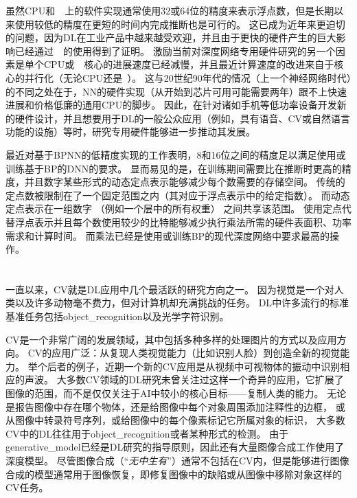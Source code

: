 虽然CPU和~~上的软件实现通常使用32或64位的精度来表示浮点数，但是长期以来使用较低的精度在更短的时间内完成推断也是可行的\citep{Holt-et-al-1991,Holi+Hwang-1993,Presley-et-al-1994,Simard+Graf-NIPS1994,Wawrzynek-et-al-IEEE1996,Savich-et-al-2007}。
这已成为近年来更迫切的问题，因为\gls{DL}在工业产品中越来越受欢迎，并且由于更快的硬件产生的巨大影响已经通过~~的使用得到了证明。
激励当前对深度网络专用硬件研究的另一个因素是单个CPU或~~核心的进展速度已经减慢，并且最近计算速度的改进来自于核心的并行化（无论CPU还是~）。
这与20世纪90年代的情况（上一个神经网络时代）的不同之处在于，\gls{NN}的硬件实现（从开始到芯片可用可能需要两年）跟不上快速进展和价格低廉的通用CPU的脚步。
因此，在针对诸如手机等低功率设备开发新的硬件设计，并且想要用于\gls{DL}的一般公众应用（例如，具有语音、\gls{CV}或自然语言功能的设施）等时，研究专用硬件能够进一步推动其发展。


最近对基于\gls{BP}\gls{NN}的低精度实现的工作\citep{Vanhoucke-et-al-2011,Courbariaux-et-al-ICLR2015workshop,Gupta-et-al-2015}表明，8和16位之间的精度足以满足使用或训练基于\gls{BP}的\gls{DNN}的要求。
显而易见的是，在训练期间需要比在推断时更高的精度，并且数字某些形式的动态定点表示能够减少每个数需要的存储空间。
传统的定点数被限制在了一个固定范围之内（其对应于浮点表示中的给定指数）。
而动态定点表示在一组数字 （例如一个层中的所有权重） 之间共享该范围。
使用定点代替浮点表示并且每个数使用较少的比特能够减少执行乘法所需的硬件表面积、功率需求和计算时间。
而乘法已经是使用或训练\gls{BP}的现代深度网络中要求最高的操作。



\section{}
\label{sec:computer_vision}

一直以来，\gls{CV}就是\gls{DL}应用中几个最活跃的研究方向之一。
因为视觉是一个对人类以及许多动物毫不费力，但对计算机却充满挑战的任务\citep{ballard1983parallel}。
\gls{DL}中许多流行的标准基准任务包括\gls{object_recognition}以及光学字符识别。


\gls{CV}是一个非常广阔的发展领域，其中包括多种多样的处理图片的方式以及应用方向。
\gls{CV}的应用广泛：从复现人类视觉能力（比如识别人脸）到创造全新的视觉能力。
举个后者的例子，近期一个新的\gls{CV}应用是从视频中可视物体的振动中识别相应的声波\citep{Davis2014VisualMic}。
大多数\gls{CV}领域的\gls{DL}研究未曾关注过这样一个奇异的应用，它扩展了图像的范围，而不是仅仅关注于\gls{AI}中较小的核心目标——复制人类的能力。
无论是报告图像中存在哪个物体，还是给图像中每个对象周围添加注释性的边框，
或从图像中转录符号序列，或给图像中的每个像素标记它所属对象的标识，
大多数\gls{CV}中的\gls{DL}往往用于\gls{object_recognition}或者某种形式的检测。
由于\gls{generative_model}已经是\gls{DL}研究的指导原则，因此还有大量图像合成工作使用了深度模型。
尽管图像合成（``\emph{无中生有}''）通常不包括在\gls{CV}内，但是能够进行图像合成的模型通常用于图像恢复，即修复图像中的缺陷或从图像中移除对象这样的\gls{CV}任务。

